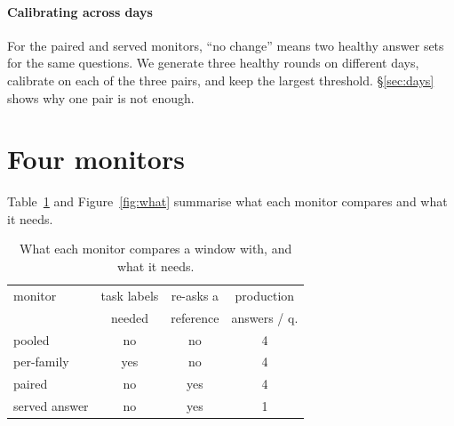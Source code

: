 \documentclass{article}
\begin{document}
\paragraph{Calibrating across days} For the paired and served monitors, ``no
change'' means two healthy answer sets for the same questions. We generate three
healthy rounds on different days, calibrate on each of the three pairs, and keep
the largest threshold. \S\ref{sec:days} shows why one pair is not enough.

\section{Four monitors}
\label{sec:monitors}

Table~\ref{tab:what} and Figure~\ref{fig:what} summarise what each monitor
compares and what it needs.

\begin{table}[t]
  \centering\small
  \caption{What each monitor compares a window with, and what it needs.}
  \label{tab:what}
  \setlength{\tabcolsep}{3pt}
  \begin{tabular}{lccc}
    \toprule
    monitor & task labels & re-asks a & production \\
            & needed      & reference & answers / q. \\
    \midrule
    pooled        & no  & no  & 4 \\
    per-family    & yes & no  & 4 \\
    paired        & no  & yes & 4 \\
    served answer & no  & yes & 1 \\
    \bottomrule
  \end{tabular}
\end{table}
\end{document}
